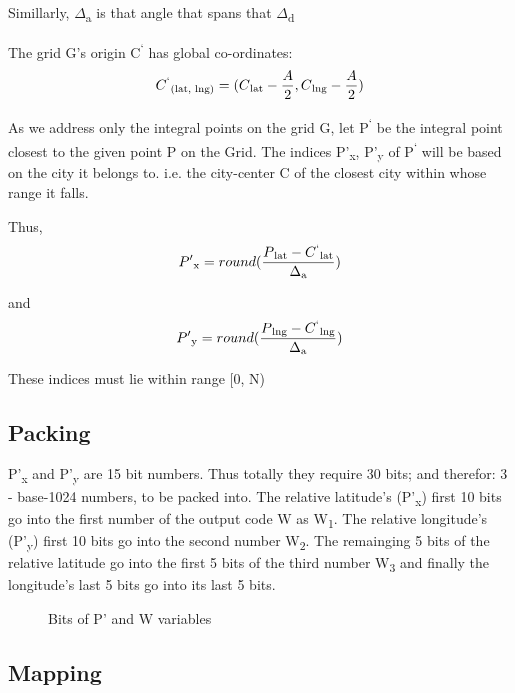 \documentclass[conference]{IEEEtran}
\begin{document}
Simillarly, $\Delta$\textsubscript{a} is that angle that spans that $\Delta$\textsubscript{d}

The grid G's origin C\textsuperscript{`} has global co-ordinates:
\begin{equation}C\textsuperscript{`}\textsubscript{(lat, lng)} = ( C\textsubscript{lat} - \frac{A}{2}, C\textsubscript{lng} - \frac{A}{2})\end{equation}

As we address only the integral points on the grid G, let P\textsuperscript{`} be the integral point closest to the given point P on the Grid.
The indices P'\textsubscript{x}, P'\textsubscript{y} of P\textsuperscript{`} will be based on the city it belongs to.
i.e. the city-center C of the closest city within whose range it falls.


Thus, \begin{equation}P'\textsubscript{x} = round(\frac{P\textsubscript{lat} - C\textsuperscript{`}\textsubscript{lat}}{\Delta\textsubscript{a}})\end{equation}

and \begin{equation}P'\textsubscript{y}= round(\frac{P\textsubscript{lng} - C\textsuperscript{`}\textsubscript{lng}}{\Delta\textsubscript{a}})\end{equation}

These indices must lie within range [0, N)

\subsection{Packing}
P'\textsubscript{x} and P'\textsubscript{y} are 15 bit numbers.
Thus totally they require 30 bits; and therefor: 3 - base-1024 numbers, to be packed into.
The relative latitude's (P'\textsubscript{x}) first 10 bits go into the first number of the output code W as W\textsubscript{1}. The relative longitude's (P'\textsubscript{y}) first 10 bits go into the second number W\textsubscript{2}. The remainging 5 bits of the relative latitude go into the first 5 bits of the third number W\textsubscript{3} and finally the longitude's last 5 bits go into its last 5 bits.
\begin{figure}[htbp]
\centerline{}
\caption{Bits of P' and W variables}
\label{Packing}
\end{figure}

\subsection{Mapping}
\end{document}
